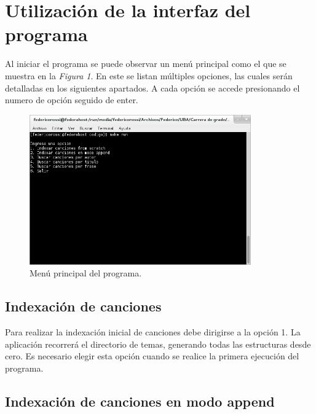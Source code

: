 \documentclass{article}
\begin{document}
\section{Utilización de la interfaz del programa}

	Al iniciar el programa se puede observar un menú principal como el que se muestra en la \textit{Figura 1}. En este se listan múltiples opciones, las cuales serán detalladas en los siguientes apartados. A cada opción se accede presionando el numero de opción seguido de enter.
	\bigskip

\begin{figure}[h]
	\centering
	\includegraphics[width=0.85\textwidth]{images/menu.png}
	\medskip
	\caption{Menú principal del programa.}
\end{figure}
\bigskip\smallskip



\subsection{Indexación de canciones}

	Para realizar la indexación inicial de canciones debe dirigirse a la opción 1. La aplicación recorrerá el directorio de temas, generando todas las estructuras desde cero. Es necesario elegir esta opción cuando se realice la primera ejecución del programa.
\bigskip



\subsection{Indexación de canciones en modo append}
\end{document}
